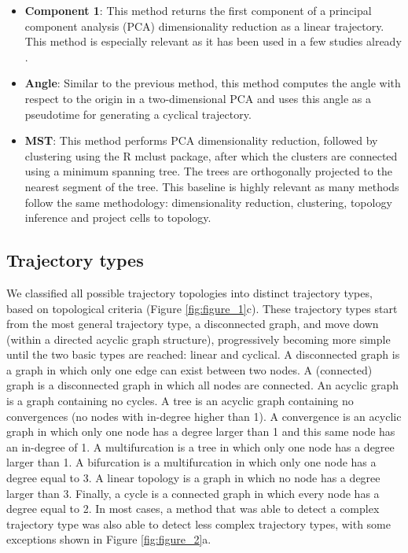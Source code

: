 \begin{itemize}
	
	\item \textbf{Component 1}: This method returns the first component of a principal component analysis (PCA) dimensionality reduction as a linear trajectory. This method is especially relevant as it has been used in a few studies already \cite{kouno_temporaldynamicstranscriptional_2013,zeng_pseudotemporalorderingsingle_2017}.
	
	\item \textbf{Angle}: Similar to the previous method, this method computes the angle with respect to the origin in a two-dimensional PCA and uses this angle as a pseudotime for generating a cyclical trajectory.
	
	\item \textbf{MST}: This method performs PCA dimensionality reduction, followed by clustering using the R mclust package, after which the clusters are connected using a minimum spanning tree. The trees are orthogonally projected to the nearest segment of the tree. This baseline is highly relevant as many methods follow the same methodology: dimensionality reduction, clustering, topology inference and project cells to topology.
	
\end{itemize}

\subsection{Trajectory types}

We classified all possible trajectory topologies into distinct trajectory types, based on topological criteria (Figure \ref{fig:figure_1}c). These trajectory types start from the most general trajectory type, a disconnected graph, and move down (within a directed acyclic graph structure), progressively becoming more simple until the two basic types are reached: linear and cyclical. A disconnected graph is a graph in which only one edge can exist between two nodes. A (connected) graph is a disconnected graph in which all nodes are connected. An acyclic graph is a graph containing no cycles. A tree is an acyclic graph containing no convergences (no nodes with in-degree higher than 1). A convergence is an acyclic graph in which only one node has a degree larger than 1 and this same node has an in-degree of 1. A multifurcation is a tree in which only one node has a degree larger than 1. A bifurcation is a multifurcation in which only one node has a degree equal to 3. A linear topology is a graph in which no node has a degree larger than 3. Finally, a cycle is a connected graph in which every node has a degree equal to 2. In most cases, a method that was able to detect a complex trajectory type was also able to detect less complex trajectory types, with some exceptions shown in Figure \ref{fig:figure_2}a.

